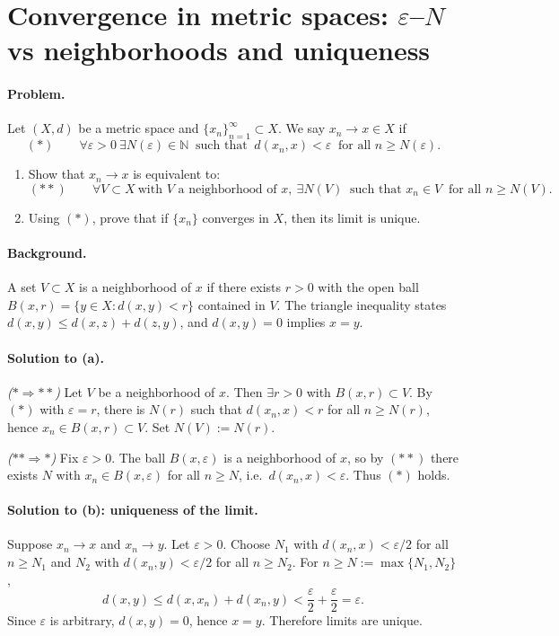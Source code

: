 \documentclass[12pt,a4paper]{article}
\begin{document}
\section*{Convergence in metric spaces: $\varepsilon$--$N$ vs neighborhoods and uniqueness}


\paragraph{Problem.}
Let $(X,d)$ be a metric space and $\{x_n\}_{n=1}^\infty\subset X$. We say $x_n\to x\in X$ if
\[
(\ast)\qquad \forall \varepsilon>0\ \exists N(\varepsilon)\in\mathbb{N}\ \text{ such that }\ d(x_n,x)<\varepsilon\ \text{ for all } n\ge N(\varepsilon).
\]
\begin{enumerate}
\item[(a)] Show that $x_n\to x$ is equivalent to:
\[
(\ast\ast)\qquad \forall V\subset X\ \text{with }V\text{ a neighborhood of }x,\ \exists N(V)\ \text{ such that } x_n\in V\ \text{ for all } n\ge N(V).
\]
\item[(b)] Using $(\ast)$, prove that if $\{x_n\}$ converges in $X$, then its limit is unique.
\end{enumerate}

\paragraph{Background.}
A set $V\subset X$ is a neighborhood of $x$ if there exists $r>0$ with the open ball $B(x,r)=\{y\in X: d(x,y)<r\}$ contained in $V$. The triangle inequality states $d(x,y)\le d(x,z)+d(z,y)$, and $d(x,y)=0$ implies $x=y$.

\paragraph{Solution to (a).}
\emph{($\ast\Rightarrow\ast\ast$)} Let $V$ be a neighborhood of $x$. Then $\exists r>0$ with $B(x,r)\subset V$. By $(\ast)$ with $\varepsilon=r$, there is $N(r)$ such that $d(x_n,x)<r$ for all $n\ge N(r)$, hence $x_n\in B(x,r)\subset V$. Set $N(V):=N(r)$.

\smallskip
\noindent
\emph{($\ast\ast\Rightarrow\ast$)} Fix $\varepsilon>0$. The ball $B(x,\varepsilon)$ is a neighborhood of $x$, so by $(\ast\ast)$ there exists $N$ with $x_n\in B(x,\varepsilon)$ for all $n\ge N$, i.e.\ $d(x_n,x)<\varepsilon$. Thus $(\ast)$ holds.

\paragraph{Solution to (b): uniqueness of the limit.}
Suppose $x_n\to x$ and $x_n\to y$. Let $\varepsilon>0$. Choose $N_1$ with $d(x_n,x)<\varepsilon/2$ for all $n\ge N_1$ and $N_2$ with $d(x_n,y)<\varepsilon/2$ for all $n\ge N_2$. For $n\ge N:=\max\{N_1,N_2\}$,
\[
d(x,y)\le d(x,x_n)+d(x_n,y)<\frac{\varepsilon}{2}+\frac{\varepsilon}{2}=\varepsilon.
\]
Since $\varepsilon$ is arbitrary, $d(x,y)=0$, hence $x=y$. Therefore limits are unique.
\end{document}
